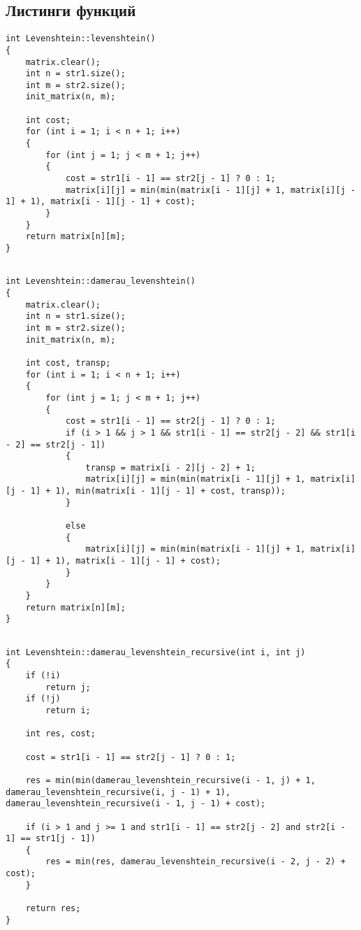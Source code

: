 \documentclass[a4paper, 14pt]{article}
\begin{document}
\subsection{Листинги функций}
\begin{lstlisting}[label=some-code,caption=Алгоритм нахождения расстояния Левенштейна]
int Levenshtein::levenshtein()
{
    matrix.clear();
    int n = str1.size();
    int m = str2.size();
    init_matrix(n, m);
    
    int cost;
    for (int i = 1; i < n + 1; i++)
    {
        for (int j = 1; j < m + 1; j++)
        {
            cost = str1[i - 1] == str2[j - 1] ? 0 : 1;
            matrix[i][j] = min(min(matrix[i - 1][j] + 1, matrix[i][j - 1] + 1), matrix[i - 1][j - 1] + cost);
        }
    }
    return matrix[n][m];
}
    
\end{lstlisting}
	\newpage
	\begin{lstlisting}[label=some-code,caption=Алгоритм нахождения расстояния Дамерау-Левенштейна]
int Levenshtein::damerau_levenshtein()
{
    matrix.clear();
    int n = str1.size();
    int m = str2.size();
    init_matrix(n, m);
    
    int cost, transp;
    for (int i = 1; i < n + 1; i++)
    {
        for (int j = 1; j < m + 1; j++)
        {
            cost = str1[i - 1] == str2[j - 1] ? 0 : 1;
            if (i > 1 && j > 1 && str1[i - 1] == str2[j - 2] && str1[i - 2] == str2[j - 1])
            {
                transp = matrix[i - 2][j - 2] + 1;
                matrix[i][j] = min(min(matrix[i - 1][j] + 1, matrix[i][j - 1] + 1), min(matrix[i - 1][j - 1] + cost, transp));
            }
            
            else
            {
                matrix[i][j] = min(min(matrix[i - 1][j] + 1, matrix[i][j - 1] + 1), matrix[i - 1][j - 1] + cost);
            }
        }
    }
    return matrix[n][m];
}
    
\end{lstlisting}
	\newpage
	\begin{lstlisting}[label=some-code,caption=Рекурсивный Алгоритм  нахождения расстояния Дамерау-Левенштейна]
int Levenshtein::damerau_levenshtein_recursive(int i, int j)
{
    if (!i)
        return j;
    if (!j)
        return i;
    
    int res, cost;
    
    cost = str1[i - 1] == str2[j - 1] ? 0 : 1;
    
    res = min(min(damerau_levenshtein_recursive(i - 1, j) + 1, damerau_levenshtein_recursive(i, j - 1) + 1), damerau_levenshtein_recursive(i - 1, j - 1) + cost);
    
    if (i > 1 and j >= 1 and str1[i - 1] == str2[j - 2] and str2[i - 1] == str1[j - 1])
    {
        res = min(res, damerau_levenshtein_recursive(i - 2, j - 2) + cost);
    }
    
    return res;
}
    
	\end{lstlisting}
	
\end{document}
